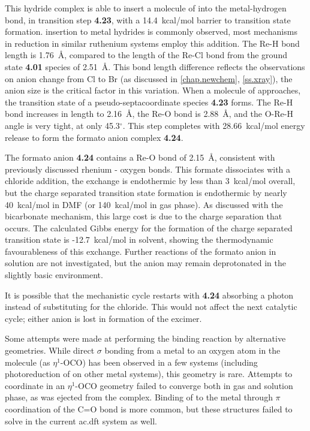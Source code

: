 This hydride complex is able to insert a molecule of  into the metal-hydrogen bond, in transition step \textbf{4.23}, with a 14.4~kcal/mol barrier to transition state formation.  insertion to metal hydrides is commonly observed, most mechanisms in  reduction in similar ruthenium systems employ this addition\autocite{creutz2007}. The Re-H bond length is 1.76~\r{A}, compared to the length of the Re-Cl bond from the ground state \textbf{4.01} species of 2.51~\r{A}. This bond length difference reflects the observations on anion change from Cl to Br (as discussed in \autoref{chap.newchem}, \autoref{ss.xray}), the anion size is the critical factor in this variation. When a molecule of  approaches, the transition state of a pseudo-septacoordinate species \textbf{4.23} forms. The Re-H bond increases in length to 2.16~\r{A}, the Re-O bond is 2.88~\r{A}, and the O-Re-H angle is very tight, at only 45.3$^\circ$. This step completes with 28.66~kcal/mol energy release to form the formato anion complex \textbf{4.24}. 

The formato anion \textbf{4.24} contains a Re-O bond of 2.15~\r{A}, consistent with previously discussed rhenium - oxygen bonds. This formate dissociates with a chloride addition, the exchange is endothermic by less than 3~kcal/mol overall, but the charge separated transition state formation is endothermic by nearly 40~kcal/mol in DMF (or 140~kcal/mol in gas phase). As discussed with the bicarbonate mechanism, this large cost is due to the charge separation that occurs. The calculated Gibbs energy for the formation of the charge separated transition state is -12.7~kcal/mol in solvent, showing the thermodynamic favourableness of this exchange. Further reactions of the formato anion in solution are not investigated, but the anion may remain deprotonated in the slightly basic environment\autocite{morimoto2013}. 

It is possible that the mechanistic cycle restarts with \textbf{4.24} absorbing a photon instead of substituting for the chloride. This would not affect the next catalytic cycle; either anion is lost in formation of the excimer.

Some attempts were made at performing the  binding reaction by alternative geometries. While direct $\sigma$ bonding from a metal to an oxygen atom in the  molecule (as $\eta^1$-OCO) has been observed in a few systems (including photoreduction of  on other metal systems)\autocite{lee2001, mauser2001, souter1997}, this geometry is rare\autocite{castrorodriguez2004, cokoja2011, gibson1996}. Attempts to coordinate  in an $\eta^1$-OCO geometry failed to converge both in gas and solution phase, as  was ejected from the complex. Binding of  to the metal through $\pi$ coordination of the C=O bond is more common\autocite{cokoja2011, gibson1996}, but these structures failed to solve in the current \gls{ac.dft} system as well.

